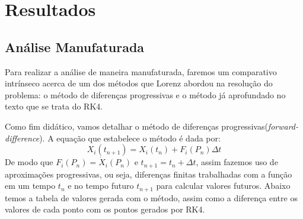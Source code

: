 \documentclass[12pt, a4paper]{article}
\begin{document}
\newpage


\section{Resultados}
\subsection{Análise Manufaturada}

Para realizar a análise de maneira manufaturada, faremos um comparativo intrínseco acerca de um dos métodos que Lorenz abordou na resolução do problema: o método de diferenças progressivas\cite{Lorenz1963} e o método já aprofundado no texto que se trata do RK4.

Como fim didático, vamos detalhar o método de diferenças progressivas(\textit{forward-difference}). A equação que estabelece o método é dada por: 
\begin{equation*}
    X_i(t_{n+1})=X_i(t_n)+F_i(P_n)\Delta t
\end{equation*}
De modo que $F_i(P_n) = \dot X_i(P_n)$ e $t_{n+1} = t_n + \Delta t$, assim fazemos uso de aproximações progressivas, ou seja, diferenças finitas trabalhadas com a função em um tempo $t_n$ e no tempo futuro $t_{n+1}$ para calcular valores futuros.  Abaixo temos a tabela de valores gerada com o método, assim como a diferença entre os valores de cada ponto com os pontos gerados por RK4.
\end{document}
